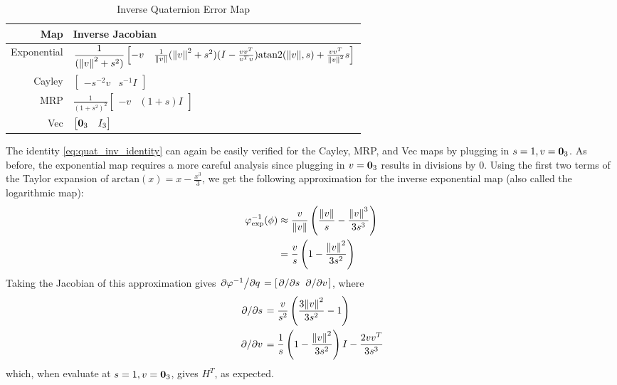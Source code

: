 \documentclass[../root.tex]{subfiles}
\begin{document}
\begin{table}[h!]
    \centering
    \begin{tabular}{r l}
        Map & Inverse Jacobian \\
        \midrule
        Exponential 
            & $ \displaystyle \frac{1}{(\norm{v}^2 + s^2)} \begin{bmatrix} 
                -v & 
                \frac{1}{\norm{v}}(\norm{v}^2 + s^2) (I - \frac{v v^T}{v^T v}) \text{atan2}(\norm{v}, s) + \frac{v v^T}{\norm{v}^2} s
            \end{bmatrix} $ \\
        Cayley 
            & $ \displaystyle \begin{bmatrix}
                -s^{-2} v & s^{-1} I
            \end{bmatrix} $ \\
        MRP 
            & $ \displaystyle \frac{1}{(1+s^2)^2} \begin{bmatrix}
                -v & (1+s) I
            \end{bmatrix} $ \\
        Vec
            & $ \displaystyle \begin{bmatrix} \mathbf{0}_3 & I_3 \end{bmatrix}  $
    \end{tabular}
    \caption{Inverse Quaternion Error Map}
    \label{tab:quat_invjac}
\end{table}
The identity \eqref{eq:quat_inv_identity} can again be easily verified for the Cayley,
MRP, and Vec maps by plugging in $s=1, v=\mathbf{0}_3$. As before, the exponential map requires 
a more careful analysis since plugging in $v=\mathbf{0}_3$ results in divisions by 0. Using the
first two terms of the Taylor expansion of $\text{arctan}(x) = x - \frac{x^3}{3}$, we 
get the following approximation for the inverse exponential map (also called the logarithmic
map):
\begin{equation}
    \begin{aligned}
        \varphi^{-1}_\text{exp}(\phi) &\approx \frac{v}{\norm{v}} 
            \left(\frac{\norm{v}}{s} - \frac{\norm{v}^3}{3s^3} \right) \\
        &= \frac{v}{s} \left(1 - \frac{\norm{v}^2}{3s^2} \right)
    \end{aligned}
\end{equation}
Taking the Jacobian of this approximation gives $\pdv*{\varphi^{-1}}{q} =
[\pdv*{}{s} \, \pdv*{v}]$, where
\begin{subequations}
    \begin{align}
        \pdv*{}{s} &= \frac{v}{s^2} \left( \frac{3 \norm{v}^2}{3 s^2} - 1 \right) \\
        \pdv*{}{v} &= \frac{1}{s}\left(1- \frac{\norm{v}^2}{3s^2} \right) I - \frac{2v v^T}{3s^3}
    \end{align}
\end{subequations}
which, when evaluate at $s=1, v=\mathbf{0}_3$, gives $H^T$, as expected.
\end{document}
